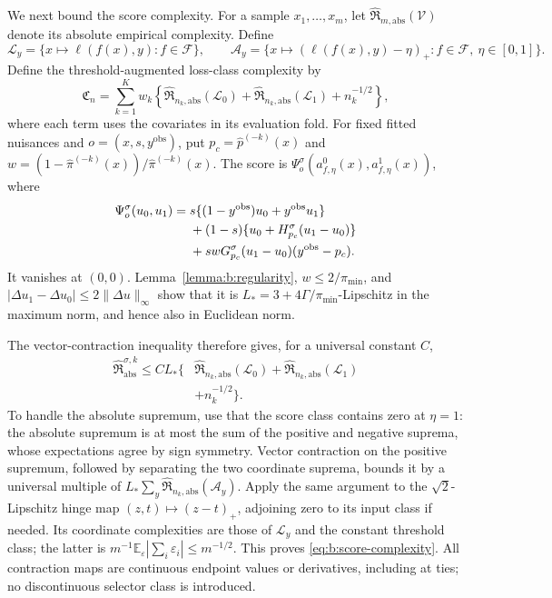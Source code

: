 We next bound the score complexity. For a sample $x_1,\ldots,x_m$,
let $\widehat{\mathfrak R}_{m,\mathrm{abs}}(\mathcal V)$ denote its
absolute empirical complexity. Define
\[
 \mathcal L_y=\{x\mapsto\ell(f(x),y):f\in\mathcal F\},\qquad
 \mathcal A_y=\{x\mapsto(\ell(f(x),y)-\eta)_+:
 f\in\mathcal F,\ \eta\in[0,1]\}.
\]
Define the threshold-augmented loss-class complexity by
\begin{equation}
 \mathfrak C_n=\sum_{k=1}^K w_k\left\{
 \widehat{\mathfrak R}_{n_k,\mathrm{abs}}(\mathcal L_0)
 +\widehat{\mathfrak R}_{n_k,\mathrm{abs}}(\mathcal L_1)
 +n_k^{-1/2}\right\},
 \label{eq:b:loss-complexity}
\end{equation}
where each term uses the covariates in its evaluation fold.
For fixed fitted nuisances and $o=(x,s,y^{\mathrm{obs}})$, put
$p_c=\widehat p^{(-k)}(x)$ and $w=(1-\widehat\pi^{(-k)}(x)) /
\widehat\pi^{(-k)}(x)$. The score is
$\Psi_o^\sigma(a^0_{f,\eta}(x),a^1_{f,\eta}(x))$, where
\begin{align}
 \Psi_o^\sigma(u_0,u_1)
 ={}&s\{(1-y^{\mathrm{obs}})u_0+y^{\mathrm{obs}}u_1\}\notag\\
 &+(1-s)\{u_0+H_{p_c}^\sigma(u_1-u_0)\}\notag\\
 &+swG_{p_c}^\sigma(u_1-u_0)(y^{\mathrm{obs}}-p_c).
 \label{eq:b:composition}
\end{align}
It vanishes at $(0,0)$. Lemma~\ref{lemma:b:regularity},
$w\leq2/\pi_{\min}$, and
$|\Delta u_1-\Delta u_0|\leq2\|\Delta u\|_\infty$ show that it is
$L_*=3+4\Gamma/\pi_{\min}$-Lipschitz in the maximum norm,
and hence also in Euclidean norm.

The vector-contraction inequality \cite{maurer2016vector} therefore gives,
for a universal constant $C$,
\begin{equation}
 \begin{aligned}
 \widehat{\mathfrak R}^{\sigma,k}_{\mathrm{abs}}
 \leq C L_*\Big\{&
 \widehat{\mathfrak R}_{n_k,\mathrm{abs}}(\mathcal L_0)
 +\widehat{\mathfrak R}_{n_k,\mathrm{abs}}(\mathcal L_1)\\
 &+n_k^{-1/2}\Big\}.
 \end{aligned}
 \label{eq:b:score-complexity}
\end{equation}
To handle the absolute supremum, use that the score class contains zero
at $\eta=1$: the absolute supremum is at most the sum of the positive and
negative suprema, whose expectations agree by sign symmetry. Vector
contraction on the positive supremum, followed by separating the two
coordinate suprema, bounds it by a universal multiple of
$L_*\sum_y\widehat{\mathfrak R}_{n_k,\mathrm{abs}}(\mathcal A_y)$.
Apply the same argument to the $\sqrt2$-Lipschitz hinge map
$(z,t)\mapsto(z-t)_+$, adjoining zero to its input class if needed.
Its coordinate complexities are those of $\mathcal L_y$ and the constant
threshold class; the latter is
$m^{-1}\mathbb E_\varepsilon|\sum_i\varepsilon_i|\leq m^{-1/2}$.
This proves \eqref{eq:b:score-complexity}. All contraction maps are
continuous endpoint values or derivatives, including at ties; no
discontinuous selector class is introduced.


